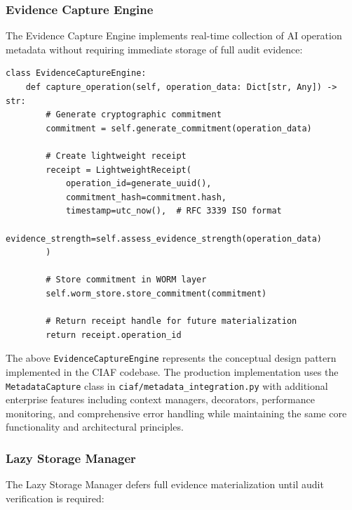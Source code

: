 \documentclass[12pt,a4paper]{article}
\begin{document}
\subsubsection{Evidence Capture Engine}

The Evidence Capture Engine implements real-time collection of AI operation metadata without requiring immediate storage of full audit evidence:

\begin{lstlisting}[caption=Evidence Capture Core Algorithm]
class EvidenceCaptureEngine:
    def capture_operation(self, operation_data: Dict[str, Any]) -> str:
        # Generate cryptographic commitment
        commitment = self.generate_commitment(operation_data)
        
        # Create lightweight receipt
        receipt = LightweightReceipt(
            operation_id=generate_uuid(),
            commitment_hash=commitment.hash,
            timestamp=utc_now(),  # RFC 3339 ISO format
            evidence_strength=self.assess_evidence_strength(operation_data)
        )
        
        # Store commitment in WORM layer
        self.worm_store.store_commitment(commitment)
        
        # Return receipt handle for future materialization
        return receipt.operation_id
\end{lstlisting}

\begin{tcolorbox}[colframe=blue!70, colback=green!8, title={\textbf{Implementation Note}}]
The above \texttt{EvidenceCaptureEngine} represents the conceptual design pattern implemented in the CIAF codebase. The production implementation uses the \texttt{MetadataCapture} class in \texttt{ciaf/metadata\_integration.py} with additional enterprise features including context managers, decorators, performance monitoring, and comprehensive error handling while maintaining the same core functionality and architectural principles.
\end{tcolorbox}

\subsubsection{Lazy Storage Manager}

The Lazy Storage Manager defers full evidence materialization until audit verification is required:
\end{document}

